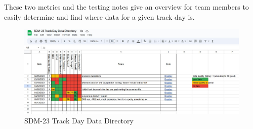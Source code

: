 These two metrics and the testing notes give an overview for team members to easily determine and find where data for a given track day is.
\begin{figure}[H]
    \centering
    \includegraphics[width=7in]{images/tddr.jpg}
    \caption{SDM-23 Track Day Data Directory}
    \label{fig:tddr}
\end{figure}
